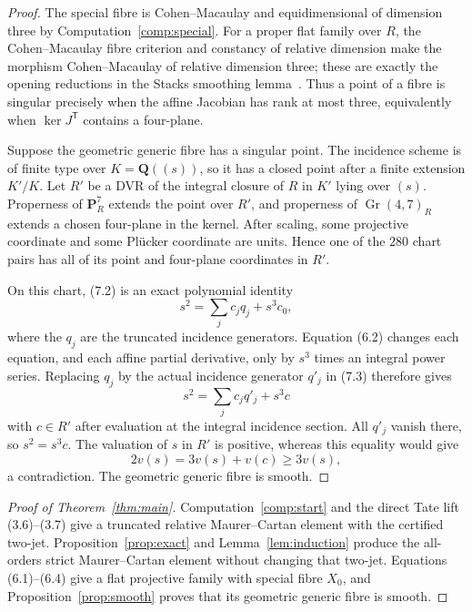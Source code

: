 \documentclass[11pt]{article}
\theoremstyle{definition}
\theoremstyle{remark}
\newcommand{\QQ}{\mathbf Q}
\newcommand{\PP}{\mathbf P}
\begin{document}
\begin{proof}
The special fibre is Cohen--Macaulay and equidimensional of dimension three
by Computation~\ref{comp:special}.  For a proper flat family over $R$, the
Cohen--Macaulay fibre criterion and constancy of relative dimension make the
morphism Cohen--Macaulay of relative dimension three; these are exactly the
opening reductions in the Stacks smoothing lemma~\cite[Tag 0E7T]{StacksSmooth}.
Thus a point of a fibre is singular precisely when the affine Jacobian has
rank at most three, equivalently when $\ker J^{\mathsf T}$ contains a
four-plane.

Suppose the geometric generic fibre has a singular point.  The incidence
scheme is of finite type over $K=\QQ((s))$, so it has a closed point after a
finite extension $K'/K$.  Let $R'$ be a DVR of the integral closure of $R$
in $K'$ lying over $(s)$.  Properness of $\PP^7_R$ extends the point over
$R'$, and properness of $\operatorname{Gr}(4,7)_R$ extends a chosen
four-plane in the kernel.  After scaling, some projective coordinate and some
Pl\"ucker coordinate are units.  Hence one of the $280$ chart pairs has all
of its point and four-plane coordinates in $R'$.

On this chart, (7.2) is an exact polynomial identity
\[
 s^2=\sum_jc_jq_j+s^3c_0,                                   \tag{7.3}
\]
where the $q_j$ are the truncated incidence generators.  Equation (6.2)
changes each equation, and each affine partial derivative, only by $s^3$
times an integral power series.  Replacing $q_j$ by the actual incidence
generator $q'_j$ in (7.3) therefore gives
\[
 s^2=\sum_jc_jq'_j+s^3c
\]
with $c\in R'$ after evaluation at the integral incidence section.  All
$q'_j$ vanish there, so $s^2=s^3c$.  The valuation of $s$ in $R'$ is
positive, whereas this equality would give
\[
 2v(s)=3v(s)+v(c)\geq3v(s),
\]
a contradiction.  The geometric generic fibre is smooth.
\end{proof}

\begin{proof}[Proof of Theorem~\ref{thm:main}]
Computation~\ref{comp:start} and the direct Tate lift (3.6)--(3.7) give a
truncated relative Maurer--Cartan element with the certified two-jet.
Proposition~\ref{prop:exact} and Lemma~\ref{lem:induction} produce the
all-orders strict Maurer--Cartan element without changing that two-jet.
Equations (6.1)--(6.4) give a flat projective family with special fibre
$X_0$, and Proposition~\ref{prop:smooth} proves that its geometric generic
fibre is smooth.
\end{proof}
\end{document}

